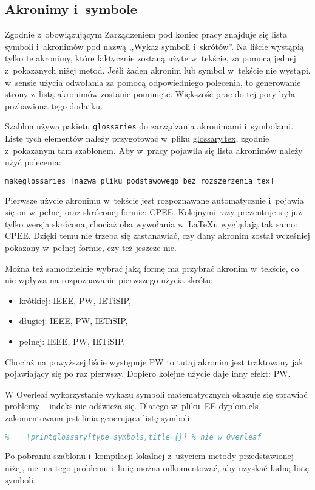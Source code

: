\subsection{Akronimy i~symbole}
Zgodnie z~obowiązującym Zarządzeniem pod koniec pracy znajduje się lista symboli i~akronimów pod nazwą ,,Wykaz symboli i~skrótów''. Na liście wystąpią tylko te akronimy, które faktycznie zostaną użyte w~tekście, za pomocą jednej z~pokazanych niżej metod. Jeśli żaden akronim lub symbol w~tekście nie wystąpi, w~sensie użycia odwołania za pomocą odpowiedniego polecenia, to generowanie strony z~listą akronimów zostanie pominięte. Większość prac do tej pory była pozbawiona tego dodatku.

Szablon używa pakietu \texttt{glossaries} do zarządzania akronimami i~symbolami. Listę tych elementów należy przygotować w~pliku \href{./glossary.tex}{glossary.tex}, zgodnie z~pokazanym tam szablonem. Aby w~pracy pojawiła się lista akronimów należy użyć polecenia:

\begin{lstlisting}[language=bash,
    numbers=none,
    caption=Wygenerowanie listy skrótów i~symboli,
    label={lst:gloss}]
makeglossaries [nazwa pliku podstawowego bez rozszerzenia tex]
\end{lstlisting}

Pierwsze użycie akronimu w~tekście jest rozpoznawane automatycznie i~pojawia się on w~pełnej oraz skróconej formie: \gls{CPEE}. Kolejnymi razy prezentuje się już tylko wersja skrócona, chociaż oba wywołania w~\LaTeX{u} wyglądają tak samo: \gls{CPEE}. Dzięki temu nie trzeba się zastanawiać, czy dany akronim został wcześniej pokazany w~pełnej formie, czy też jeszcze nie.

Można też samodzielnie wybrać jaką formę ma przybrać akronim w~tekście, co nie wpływa na rozpoznawanie pierwszego użycia skrótu:
\begin{itemize}
    \item krótkiej: \acrshort{IEEE}, \acrshort{PW}, \acrshort{IETiSIP},
    \item długiej: \acrlong{IEEE}, \acrlong{PW}, \acrlong{IETiSIP},
    \item pełnej: \acrfull{IEEE}, \acrfull{PW}, \acrfull{IETiSIP}.
\end{itemize}

Chociaż na powyższej liście występuje \gls{PW} to tutaj akronim jest traktowany jak pojawiający się po raz pierwszy. Dopiero kolejne użycie daje inny efekt: \gls{PW}.

W Overleaf wykorzystanie wykazu symboli matematycznych okazuje się sprawiać problemy -- indeks nie odświeża się. Dlatego w~pliku~\href{./EE-dyplom.cls}{EE-dyplom.cls} zakomentowana jest linia generująca listę symboli:
\begin{lstlisting}[language=TeX,
    numbers=none,
    caption=EE-dyplom.cls,
    label={lst:EE-dyplom}]
%    \printglossary[type=\acronymtype,title={}] % nie w Overleaf
%    \printglossary[type=symbols,title={}] % nie w Overleaf
\end{lstlisting}
Po pobraniu szablonu i~kompilacji lokalnej z~użyciem metody przedstawionej niżej, nie ma tego problemu i~linię można odkomentować, aby uzyskać ładną listę symboli.

